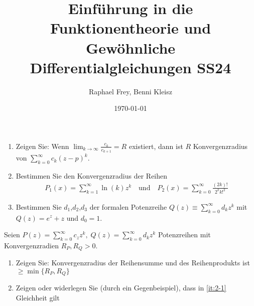 \documentclass[ngerman]{report}
\title{Einführung in die Funktionentheorie und Gewöhnliche Differentialgleichungen SS24}
\author{Raphael Frey, Benni Kleisz}
\institute{Universität Tübingen}
\date{\today}
\begin{document}
\begin{question}\hspace{\linewidth}
    \begin{enumerate}
        \item Zeigen Sie: Wenn $\lim_{k\to\infty} \frac{c_k}{c_{k+1}}= R$ existiert, dann ist $R$ Konvergenzradius von $\sum_{k=0}^\infty c_k (z-p)^k$.
        \item Bestimmen Sie den Konvergenzradius der Reihen
        \begin{align*}
            P_1(x) = \sum_{k=1}^\infty \ln(k)z^k \quad \text{und} \quad P_2(x) = \sum_{k=0}^\infty \frac{(2k)!}{2^k k!^2}
        \end{align*}
        \item Bestimmen Sie $d_1$,$d_2$,$d_3$ der formalen Potenzreihe $Q(z) \equiv \sum_{k=0}^\infty d_k z^k$ mit $Q(z) = e^z+z$ und $d_0 = 1$.
    \end{enumerate}
\end{question}
\begin{answer}
\end{answer}
\newpage
\begin{question}
    Seien $P(z)=\sum^\infty_{k=0}c_zz^k,\; Q(z)=\sum^\infty_{k=0}d_kz^k$ Potenzreihen mit Konvergenzradien $R_P,R_Q > 0$.
    \begin{enumerate}
        \item Zeigen Sie: Konvergenzradius der Reihensumme und des Reihenprodukts ist $\geq \min\{R_P,R_Q\}$\label{it:2-1}
        \item Zeigen oder widerlegen Sie (durch ein Gegenbeispiel), dass in \ref{it:2-1} Gleichheit gilt
    \end{enumerate}
\end{question}
\begin{answer}
\end{answer}
\newpage
\end{document}
